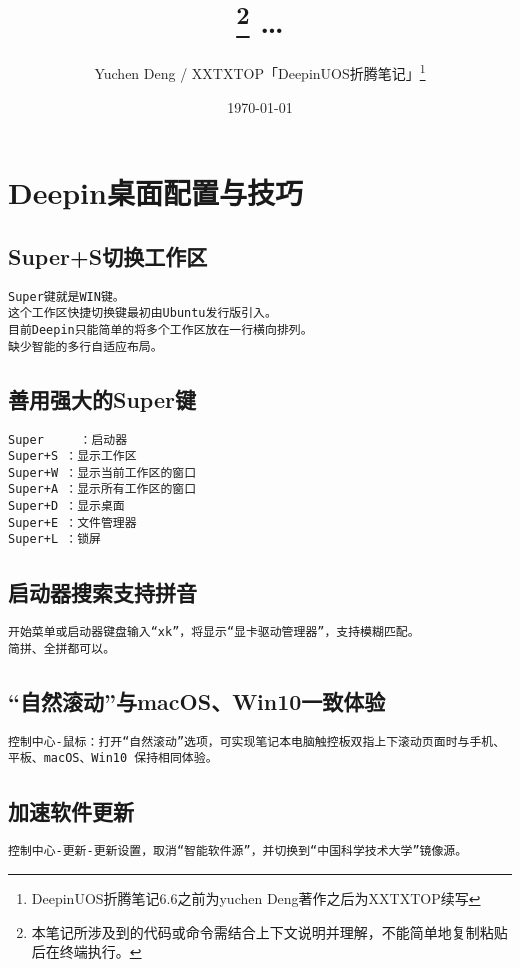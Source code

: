 \documentclass[a4paper,fontset=fandol,zihao=-4,linespread=1.2]{ctexbook}
\title{\kaishu {\textcolor{blue!80}{Deepin\hspace{0em}折腾笔记 v6.7}} \footnote{\textcolor{red!80}{本笔记所涉及到的代码或命令需结合上下文说明并理解，不能简单地复制粘贴后在终端执行。}} \ldots}
\author{\fangsong Yuchen Deng / XXTXTOP「{\textcolor{red!80}{\hspace{0em}Deepin\hspace{0.3em}UOS\hspace{0.3em}折腾笔记}}」\footnote{{\textcolor{blue!80}{\hspace{0em}Deepin\hspace{0.3em}UOS\hspace{0.3em}折腾笔记\hspace{0.1em}6.6之前为yuchen Deng著作之后为XXTXTOP续写}}}}
\date{\kaishu\today}
\begin{document}
\maketitle
\tableofcontents

\chapter{Deepin桌面配置与技巧}

\section{Super+S切换工作区}
\begin{lstlisting}
Super键就是WIN键。
这个工作区快捷切换键最初由Ubuntu发行版引入。
目前Deepin只能简单的将多个工作区放在一行横向排列。
缺少智能的多行自适应布局。
\end{lstlisting}

\section{善用强大的Super键}
\begin{lstlisting}
Super	  ：启动器
Super+S	：显示工作区
Super+W	：显示当前工作区的窗口
Super+A	：显示所有工作区的窗口
Super+D	：显示桌面
Super+E	：文件管理器
Super+L	：锁屏
\end{lstlisting}

\section{启动器搜索支持拼音}
\begin{lstlisting}
开始菜单或启动器键盘输入“xk”，将显示“显卡驱动管理器”，支持模糊匹配。
简拼、全拼都可以。
\end{lstlisting}

\section{“自然滚动”与macOS、Win10一致体验}
\begin{lstlisting}
控制中心-鼠标：打开“自然滚动”选项，可实现笔记本电脑触控板双指上下滚动页面时与手机、平板、macOS、Win10 保持相同体验。
\end{lstlisting}

\section{加速软件更新}
\begin{lstlisting}
控制中心-更新-更新设置，取消“智能软件源”，并切换到“中国科学技术大学”镜像源。
\end{lstlisting}
\end{document}
